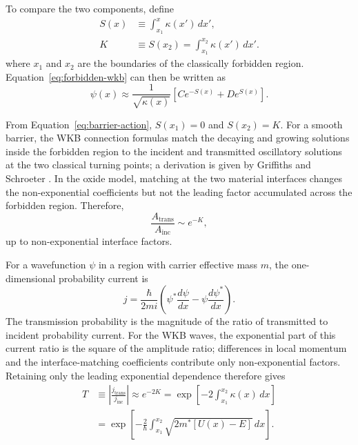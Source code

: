\documentclass[12pt]{article}
\begin{document}
To compare the two components, define
\begin{equation}
    \begin{aligned}
        S(x)&\equiv\int_{x_1}^{x}\kappa(x')\,dx',\\
        K&\equiv S(x_2)
        =\int_{x_1}^{x_2}\kappa(x')\,dx'.
    \end{aligned}
    \label{eq:barrier-action}
\end{equation}
where \(x_1\) and \(x_2\) are the boundaries of the classically forbidden region. Equation~\eqref{eq:forbidden-wkb} can then be written as
\begin{equation}
    \psi(x)\approx
    \frac{1}{\sqrt{\kappa(x)}}
    \left[Ce^{-S(x)}+De^{S(x)}\right].
    \label{eq:forbidden-action}
\end{equation}

From Equation~\eqref{eq:barrier-action}, \(S(x_1)=0\) and \(S(x_2)=K\). For a smooth barrier, the WKB connection formulas match the decaying and growing solutions inside the forbidden region to the incident and transmitted oscillatory solutions at the two classical turning points; a derivation is given by Griffiths and Schroeter \cite[Sec.~9.3]{griffiths2018}. In the oxide model, matching at the two material interfaces changes the non-exponential coefficients but not the leading factor accumulated across the forbidden region. Therefore,
\[
    \frac{A_{\mathrm{trans}}}{A_{\mathrm{inc}}}\sim e^{-K},
\]
up to non-exponential interface factors.

For a wavefunction \(\psi\) in a region with carrier effective mass \(m\), the one-dimensional probability current is
\begin{equation*}
    j=\frac{\hbar}{2mi}
    \left(
        \psi^*\frac{d\psi}{dx}
        -\psi\frac{d\psi^*}{dx}
    \right).
\end{equation*}
The transmission probability is the magnitude of the ratio of transmitted to incident probability current. For the WKB waves, the exponential part of this current ratio is the square of the amplitude ratio; differences in local momentum and the interface-matching coefficients contribute only non-exponential factors. Retaining only the leading exponential dependence therefore gives
\begin{align}
    T
    &\equiv\left|\frac{j_{\mathrm{trans}}}{j_{\mathrm{inc}}}\right|
    \approx e^{-2K}
    =\exp\left[
        -2\int_{x_1}^{x_2}\kappa(x)\,dx
    \right]
    \label{eq:wkb-transmission-kappa}\\
    &=\exp\left[
        -\frac{2}{\hbar}
        \int_{x_1}^{x_2}
        \sqrt{2m^*[U(x)-E]}\,dx
    \right].
    \label{eq:wkb-transmission}
\end{align}
\end{document}
